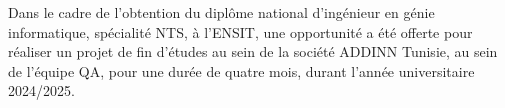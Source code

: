 Dans le cadre de l'obtention du diplôme national d'ingénieur en génie informatique, spécialité \ac{NTS}, à l'\ac{ENSIT}, une opportunité a été offerte pour réaliser un projet de fin d'études au sein de la société ADDINN Tunisie, au sein de l'équipe \ac{QA}, pour une durée de quatre mois, durant l'année universitaire 2024/2025.